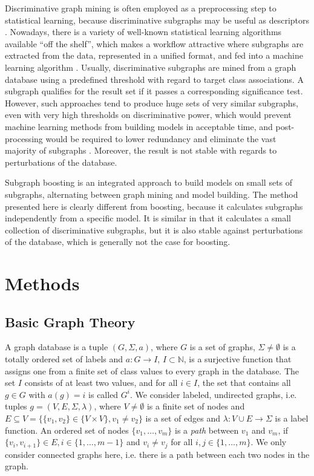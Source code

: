\documentclass{sig-alternate}
\begin{document}
Discriminative graph mining is often employed as a preprocessing step to
statistical learning, because discriminative subgraphs may be useful as descriptors
\cite{bringmann10lego}. Nowadays, there is a variety of well-known statistical
learning algorithms available ``off the shelf'', which makes a workflow
attractive where subgraphs are extracted from the data, represented in a
unified format, and fed into a machine learning algorithm \cite{KRH01}.
Usually, discriminative subgraphs are mined from a graph database using a
predefined threshold with regard to target class associations. A subgraph
qualifies for the result set if it passes a corresponding significance test.
However, such approaches tend to produce huge sets of very similar subgraphs,
even with very high thresholds on discriminative power, which would prevent
machine learning methods from building models in acceptable time, and post-processing 
would be required to lower redundancy and eliminate the vast
majority of subgraphs \cite{Hasan_origami:mining,Jun04Spin}.  Moreover, the
result is not stable with regards to perturbations of the database.

Subgraph boosting \cite{saigo09gboost} is an integrated approach to build models on
small sets of subgraphs, alternating between graph mining and model building. The method presented here is clearly
different from boosting, because it calculates subgraphs independently from a specific model.  It is similar in that it calculates a small
collection of discriminative subgraphs, but it is also stable against
perturbations of the database, which is generally not the case for boosting.


\section{Methods}
\label{s:Methods}

\subsection{Basic Graph Theory}
\label{ss:BasicGraphTheory}
A graph database is a tuple $(G, \Sigma, a)$, where $G$ is a set of graphs,
$\Sigma \ne \emptyset$  is a totally ordered set of labels and $a: G
\rightarrow I$, $I \subset \mathbb{N}$, is a surjective function that assigns one from a
finite set of class values to every graph in the database.  The set 
$I$ consists of at least two values, and for all $i \in I$, the set that contains all $g \in G$
with $a(g)=i$ is called $G^i$. We consider labeled, undirected
graphs, i.e. tuples $g=(V,E,\Sigma,\lambda)$, where $V\ne \emptyset$ is a
finite set of nodes and $E \subseteq V = \{\{v_1, v_2\} \in \{V \times V\}, v_1
\ne v_2\}$ is a set of edges and $\lambda: V\cup E \rightarrow \Sigma$ is a
label function.  
An ordered set of nodes $\{ v_1, \ldots, v_m\}$ is a \emph{path} between $v_1$ and $v_m$, if $\{v_i, v_{i+1}\} \in E, i \in \{1,\ldots,m-1\}$ and $v_i \neq v_j$ for all $i,j\in \{1,\ldots,m\}$.
We only consider connected graphs here, i.e.  there is a path
between each two nodes in the graph.
\end{document}
